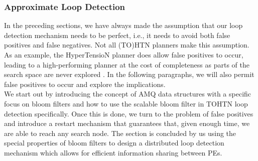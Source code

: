 \subsubsection{Approximate Loop Detection}
\label{ld - approximate loop detection}
In the preceding sections, we have always made the assumption that our loop detection mechanism needs to be perfect, i.e., it needs to avoid both false positives and false negatives. Not all (TO)HTN planners make this assumption. As an example, the HyperTensioN planner does allow false positives to occur, leading to a high-performing planner at the cost of completeness as parts of the search space are never explored \cite{magnaguagno2020hypertension}. In the following paragraphs, we will also permit false positives to occur and explore the implications. \\
We start out by introducing the concept of AMQ data structures with a specific focus on bloom filters and how to use the scalable bloom filter in TOHTN loop detection specifically. Once this is done, we turn to the problem of false positives and introduce a restart mechanism that guarantees that, given enough time, we are able to reach any search node. The section is concluded by us using the special properties of bloom filters to design a distributed loop detection mechanism which allows for efficient information sharing between PEs.
\begin{comment}
- so far: loop detection is perfect
- what if we drop this assumption of no false positives?
- short overview over AMQ data structures, focus on bloom filters
- explore the implications on completeness
- how does this help us with distributed loop detection?
\end{comment}

